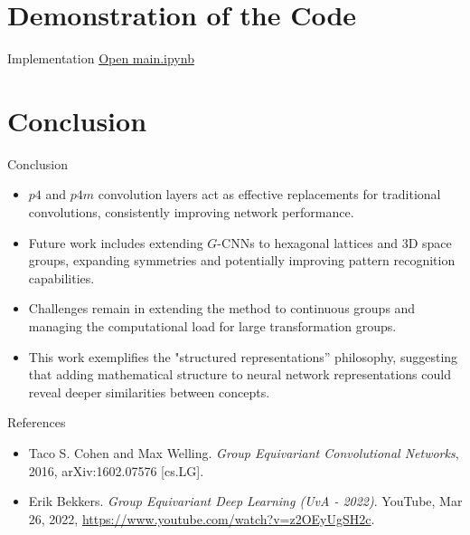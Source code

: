 \documentclass{beamer}
\begin{document}
\section{Demonstration of the Code}
\begin{frame}{Implementation}
    \href{run:jupyter-notebook Users/danielralston/Desktop/ece594n/hw_papers/Cohen-Group_Equivariant_Convolutional_Networks-2016/main.ipynb}{Open main.ipynb}
\end{frame}

\section{Conclusion}
\begin{frame}{Conclusion}
    \begin{itemize}
        \item $p4$ and $p4m$ convolution layers act as effective replacements for traditional convolutions, consistently improving network performance.
        \item Future work includes extending $G$-CNNs to hexagonal lattices and 3D space groups, expanding symmetries and potentially improving pattern recognition capabilities.
        \item Challenges remain in extending the method to continuous groups and managing the computational load for large transformation groups.
        \item This work exemplifies the "structured representations” philosophy, suggesting that adding mathematical structure to neural network representations could reveal deeper similarities between concepts.
      \end{itemize}
\end{frame}

\begin{frame}{References}
    \begin{itemize}
        \item Taco S. Cohen and Max Welling. \textit{Group Equivariant Convolutional Networks}, 2016, arXiv:1602.07576 [cs.LG].
        \item Erik Bekkers. \textit{Group Equivariant Deep Learning (UvA - 2022)}. YouTube, Mar 26, 2022, \url{https://www.youtube.com/watch?v=z2OEyUgSH2c}.
    \end{itemize}
\end{frame}
\end{document}
